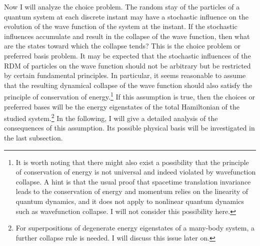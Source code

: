 Now I will analyze the choice problem. The random stay of the particles of a quantum system at each discrete instant may have a stochastic influence on the evolution of the wave function of the system at the instant. If the stochastic influences accumulate and result in the collapse of the wave function, then what are the states toward which the collapse tends? This is the choice problem or preferred basis problem. It may be expected that the stochastic influences of the RDM of particles on the wave function should not be arbitrary but be restricted by certain fundamental principles. In particular, it seems reasonable to assume that the resulting dynamical collapse of the wave function should also satisfy the principle of conservation of energy.\footnote{It is worth noting that there might also exist a possibility that the principle of conservation of energy is not universal and indeed violated by wavefunction collapse. A hint is that the usual proof that spacetime translation invariance leads to the conservation of energy and momentum relies on the linearity of quantum dynamics, and it does not apply to nonlinear quantum dynamics such as wavefunction collapse. I will not consider this possibility here.}  If this assumption is true, then the choices or preferred bases will be the energy eigenstates of the total Hamiltonian of the studied system.\footnote{For superpositions of degenerate energy eigenstates of a many-body system, a further collapse rule is needed. I will discuss this issue later on.} In the following, I will give a detailed analysis of the consequences of this assumption. Its possible physical basis will be investigated in the last subsection.

